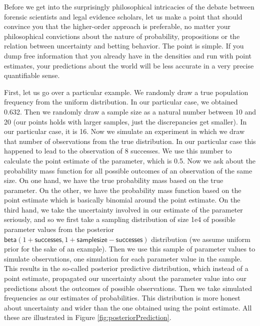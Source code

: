 \documentclass[
  10pt,
  dvipsnames,enabledeprecatedfontcommands]{scrartcl}
\newcommand{\s}[1]{\mbox{$\mathsf{#1}$}}
\begin{document}
Before we get into the surprisingly philosophical intricacies of the
debate between forensic scientists and legal evidence scholars, let us
make a point that should convince you that the higher-order approach is
preferable, no matter your philosophical convictions about the nature of
probability, propositions or the relation between uncertainty and
betting behavior. The point is simple. If you dump free information that
you already have in the densities and run with point estimates, your
predictions about the world will be less accurate in a very precise
quantifiable sense.

First, let us go over a particular example. We randomly draw a true
population frequency from the uniform distribution. In our particular
case, we obtained 0.632. Then we randomly draw a sample size as a
natural number between 10 and 20 (our points holds with larger samples,
just the discrepancies get smaller). In our particular case, it is 16.
Now we simulate an experiment in which we draw that number of
observations from the true distribution. In our particular case this
happened to lead to the observation of 8 successes. We use this number
to calculate the point estimate of the parameter, which is 0.5. Now we
ask about the probability mass function for all possible outcomes of an
observation of the same size. On one hand, we have the true probability
mass based on the true parameter. On the other, we have the probability
mass function based on the point estimate which is basically binomial
around the point estimate. On the third hand, we take the uncertainty
involved in our estimate of the parameter seriously, and so we first
take a sampling distribution of size 1e4 of possible parameter values
from the posterior
\(\s{beta}(1+\s{successes}, 1+\s{sample size} - \s{successes})\)
distribution (we assume uniform prior for the sake of an example). Then
we use this sample of parameter values to simulate observations, one
simulation for each parameter value in the sample. This results in the
so-called posterior predictive distribution, which instead of a point
estimate, propagated our uncertainty about the parameter value into our
predictions about the outcomes of possible observations. Then we take
simulated frequencies as our estimates of probabilities. This
distribution is more honest about uncertainty and wider than the one
obtained using the point estimate. All these are illustrated in Figure
\ref{fig:posteriorPrediction}.
\end{document}
